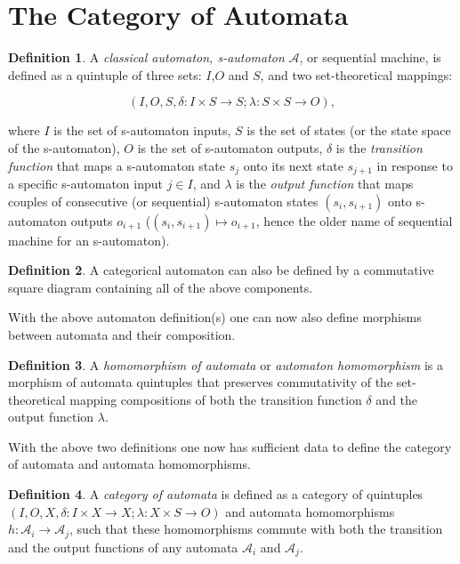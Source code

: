 \documentclass[12pt]{article}
\theoremstyle{plain}
\theoremstyle{definition}
\newtheorem{definition}{Definition}[section]
\numberwithin{equation}{section}
\newcommand{\A}{\mathcal A}
\begin{document}
\section{The Category of Automata}

\begin{definition}
A {\em classical automaton, s-automaton} $\A$, or sequential machine, is defined as a quintuple of three sets: $I$,$O$ and $S$, and two set-theoretical mappings:

$$(I, O, S, \delta: I \times S \rightarrow S; \lambda: S \times S \rightarrow O),$$

where $I$ is the set of s-automaton inputs, $S$ is the set of states (or the state space of the s-automaton), $O$ is the set of s-automaton outputs, $\delta$ is the {\em transition function} that maps a s-automaton state $s_j$ onto its next state $s_{j+1}$ in response to a specific s-automaton input $j \in I$, and $\lambda$ is the \emph{output function} that maps couples of consecutive (or sequential) s-automaton states $(s_i, s_{i+1})$ onto s-automaton outputs $o_{i+1}$ 
($(s_i, s_{i+1}) \mapsto o_{i+1}$, hence the older name of sequential machine for an s-automaton).
\end{definition}

\begin{definition}
 A categorical automaton can also be defined by a commutative square diagram containing all of the above components.

\end{definition}

 With the above automaton definition(s) one can now also define morphisms between automata and their composition.

\begin{definition} A \emph{homomorphism of automata} or {\em automaton homomorphism} is a morphism of automata quintuples that preserves commutativity of the set-theoretical mapping compositions of both the transition
function $\delta$ and the output function $\lambda$. 
\end{definition}

 With the above two definitions one now has sufficient data to define the category of automata
and automata homomorphisms.
 
\begin{definition}
 A \emph{category of automata} is defined as a category of quintuples
$(I, O, X, \delta: I \times X \rightarrow X; \lambda: X \times S \rightarrow O)$ and
automata homomorphisms $h:{\A}_i \rightarrow {\A}_j$,
such that these homomorphisms commute with both the transition and the output functions of any automata ${\A}_i$ and ${\A}_j$.
\end{definition}
\end{document}

